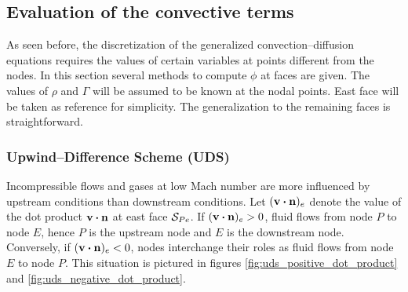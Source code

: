 
\subsection{Evaluation of the convective terms}

As seen before, the discretization of the generalized convection--diffusion equations requires the values of certain variables at points different from the nodes. In this section several methods to compute $\phi$ at faces are given. The values of $\rho$ and $\Gamma$ will be assumed to be known at the nodal points. East face will be taken as reference for simplicity. The generalization to the remaining faces is straightforward. 

\subsubsection{Upwind--Difference Scheme (UDS)}

Incompressible flows and gases at low Mach number are more influenced by upstream conditions than downstream conditions. 
Let $(\vb{v} \vdot \vb{n})_e$ denote the value of the dot product $\vb{v} \vdot \vb{n}$ at east face $\mathcal{S}_{Pe}$. If $(\vb{v} \vdot \vb{n})_e > 0$, fluid flows from node $P$ to node $E$, hence $P$ is the upstream node and $E$ is the downstream node. Conversely, if $(\vb{v} \vdot \vb{n})_e < 0$, nodes interchange their roles as fluid flows from node $E$ to node $P$. This situation is pictured in figures \ref{fig:uds_positive_dot_product} and \ref{fig:uds_negative_dot_product}.

